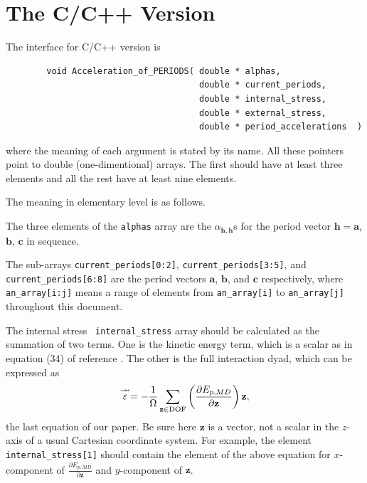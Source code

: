 \documentclass[aps]{revtex4}
\newcommand{\srr}[1]{\stackrel{\rightharpoonup\!\!\!\!\rightharpoonup }{#1}}
\newcommand{\Tep}[0]{\srr{\cal\varepsilon}}
\newcommand{\bh}[0]{\mathbf h}
\newcommand{\ba}{\mathbf a}
\newcommand{\bb}{\mathbf b}
\newcommand{\bc}{\mathbf c}
\begin{document}
\newpage












\section{The C/C++ Version}

The interface for C/C++ version is
\begin{verbatim}
        void Acceleration_of_PERIODS( double * alphas,
                                      double * current_periods,
                                      double * internal_stress,
                                      double * external_stress,
                                      double * period_accelerations  )
\end{verbatim} 
where the meaning of each argument is stated by its name. All these pointers point to double (one-dimentional) arrays. The first should have at least three elements and all the rest have at least nine elements.

The meaning in elementary level is as follows.  

The three elements of the \verb!alphas! array are the $\alpha _{\bh,\bh}$s for the period vector $\bh=\ba$, $\bb$, $\bc$ in sequence.

The sub-arrays \verb!current_periods[0:2]!,  \verb!current_periods[3:5]!, and  \verb!current_periods[6:8]! 
are the period vectors $\ba$, $\bb$, and $\bc$ respectively, where \verb!an_array[i:j]! means a range of elements from \verb!an_array[i]! to \verb!an_array[j]! 
throughout this document. 

The internal stress \verb! internal_stress! array should be 
calculated as the summation of two terms. One is 
the kinetic energy term, which is a scalar as in equation (34) of reference \cite{glarxiv}. The other is the full interaction dyad, which can be 
expressed as
\begin{equation}
\Tep=-\frac 1\Omega \sum_{\mathbf z\in\text{DOF}} \left( \frac{\partial E_{p,MD}}{\partial\mathbf z}\right)\mathbf z,
\label{verynew}
\end{equation}
the last equation of our paper\cite{glcjp,glarxiv}. Be sure here $\mathbf z$ is a vector, not a scalar in the $z$-axis of a usual 
Cartesian coordinate system. For example, the element \verb! internal_stress[1]! should  contain the element of the above 
equation for  $x$-component of $ \frac{\partial E_{p,MD}}{\partial\mathbf z}$ and  $y$-component of $\mathbf z$. 
\end{document}
